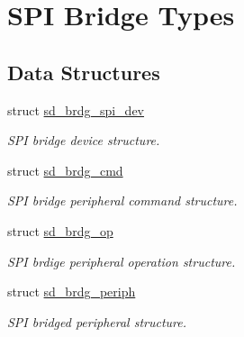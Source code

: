 \hypertarget{group___s_d___b_r_d_g___types}{}\section{S\+PI Bridge Types}
\label{group___s_d___b_r_d_g___types}
\subsection*{Data Structures}
\begin{DoxyCompactItemize}
\item 
struct \mbox{\hyperlink{structsd__brdg__spi__dev}{sd\+\_\+brdg\+\_\+spi\+\_\+dev}}
\begin{DoxyCompactList}\small\item\em S\+PI bridge device structure. \end{DoxyCompactList}\item 
struct \mbox{\hyperlink{structsd__brdg__cmd}{sd\+\_\+brdg\+\_\+cmd}}
\begin{DoxyCompactList}\small\item\em S\+PI bridge peripheral command structure. \end{DoxyCompactList}\item 
struct \mbox{\hyperlink{structsd__brdg__op}{sd\+\_\+brdg\+\_\+op}}
\begin{DoxyCompactList}\small\item\em S\+PI brdige peripheral operation structure. \end{DoxyCompactList}\item 
struct \mbox{\hyperlink{structsd__brdg__periph}{sd\+\_\+brdg\+\_\+periph}}
\begin{DoxyCompactList}\small\item\em S\+PI bridged peripheral structure. \end{DoxyCompactList}\end{DoxyCompactItemize}
